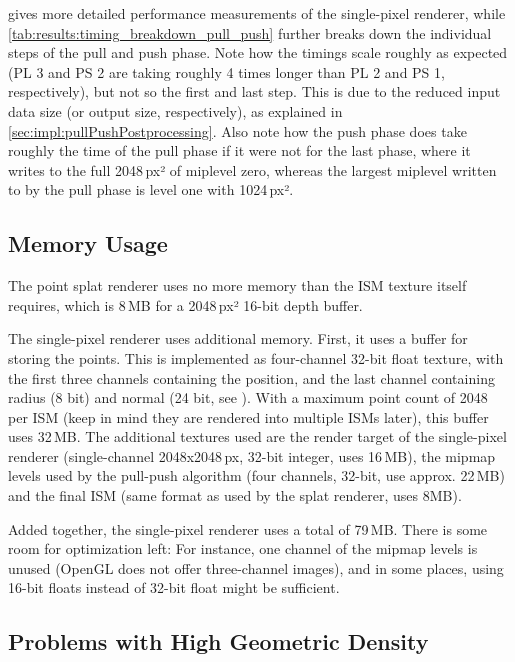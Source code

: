 gives more detailed performance measurements of the single-pixel renderer, while \cref{tab:results:timing_breakdown_pull_push} further breaks down the individual steps of the pull and push phase. Note how the timings scale roughly as expected (PL 3 and PS 2 are taking roughly 4 times longer than PL 2 and PS 1, respectively), but not so the first and last step. This is due to the reduced input data size (or output size, respectively), as explained in \cref{sec:impl:pullPushPostprocessing}. Also note how the push phase does take roughly the time of the pull phase if it were not for the last phase, where it writes to the full 2048\,px² of miplevel zero, whereas the largest miplevel written to by the pull phase is level one with 1024\,px².



\subsection{Memory Usage}
\label{sec:results:ism:memory}

The point splat renderer uses no more memory than the ISM texture itself requires, which is 8\,MB for a 2048\,px² 16-bit depth buffer.

The single-pixel renderer uses additional memory. First, it uses a buffer for storing the points. This is implemented as four-channel 32-bit float texture, with the first three channels containing the position, and the last channel containing radius (8 bit) and normal (24 bit, see \cite{Cigolle:2014:NormalPacking}). With a maximum point count of 2048 per ISM (keep in mind they are rendered into multiple ISMs later), this buffer uses 32\,MB.
The additional textures used are the render target of the single-pixel renderer (single-channel 2048x2048\,px, 32-bit integer, uses 16\,MB), the mipmap levels used by the pull-push algorithm (four channels, 32-bit, use approx. 22\,MB) and the final ISM (same format as used by the splat renderer, uses 8MB).

Added together, the single-pixel renderer uses a total of 79\,MB. There is some room for optimization left: For instance, one channel of the mipmap levels is unused (OpenGL does not offer three-channel images), and in some places, using 16-bit floats instead of 32-bit float might be sufficient.


\subsection{Problems with High Geometric Density}
\label{sec:results:ism:densityProblems}

